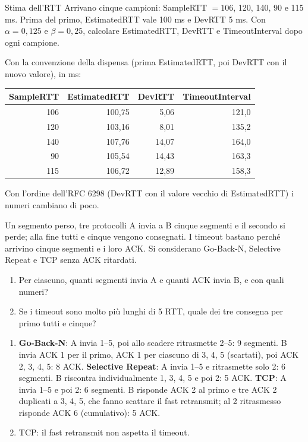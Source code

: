 \begin{esercizio}{Stima dell'RTT}
Arrivano cinque campioni: SampleRTT $= 106$, 120, 140, 90 e 115 ms. Prima del primo, EstimatedRTT vale 100 ms e DevRTT 5 ms. Con
$\alpha = 0{,}125$ e $\beta = 0{,}25$, calcolare EstimatedRTT, DevRTT e TimeoutInterval dopo ogni campione.

\svolgimento
Con la convenzione della dispensa (prima EstimatedRTT, poi DevRTT con il nuovo valore), in ms:
\begin{center}
\begin{tabular}{rrrr}
\toprule
\textbf{SampleRTT} & \textbf{EstimatedRTT} & \textbf{DevRTT} & \textbf{TimeoutInterval} \\
\midrule
106 & 100,75 & 5,06 & 121,0 \\
120 & 103,16 & 8,01 & 135,2 \\
140 & 107,76 & 14,07 & 164,0 \\
90 & 105,54 & 14,43 & 163,3 \\
115 & 106,72 & 12,89 & 158,3 \\
\bottomrule
\end{tabular}
\end{center}
Con l'ordine dell'RFC 6298 (DevRTT con il valore vecchio di EstimatedRTT) i numeri cambiano di poco.
\end{esercizio}

\begin{esercizio}{Un segmento perso, tre protocolli}
A invia a B cinque segmenti e il secondo si perde; alla fine tutti e cinque vengono consegnati. I timeout bastano perché arrivino cinque
segmenti e i loro ACK. Si considerano Go-Back-N, Selective Repeat e TCP senza ACK ritardati.
\begin{enumerate}[label=(\alph*)]
    \item Per ciascuno, quanti segmenti invia A e quanti ACK invia B, e con quali numeri?
    \item Se i timeout sono molto più lunghi di 5 RTT, quale dei tre consegna per primo tutti e cinque?
\end{enumerate}

\svolgimento
\begin{enumerate}[label=(\alph*)]
    \item \textbf{Go-Back-N}: A invia 1--5, poi allo scadere ritrasmette 2--5: 9 segmenti. B invia ACK 1 per il primo, ACK 1 per ciascuno di
          3, 4, 5 (scartati), poi ACK 2, 3, 4, 5: 8 ACK. \textbf{Selective Repeat}: A invia 1--5 e ritrasmette solo 2: 6 segmenti. B riscontra
          individualmente 1, 3, 4, 5 e poi 2: 5 ACK. \textbf{TCP}: A invia 1--5 e poi 2: 6 segmenti. B risponde ACK 2 al primo e tre ACK 2
          duplicati a 3, 4, 5, che fanno scattare il fast retransmit; al 2 ritrasmesso risponde ACK 6 (cumulativo): 5 ACK.
    \item TCP: il fast retransmit non aspetta il timeout.
\end{enumerate}
\end{esercizio}

